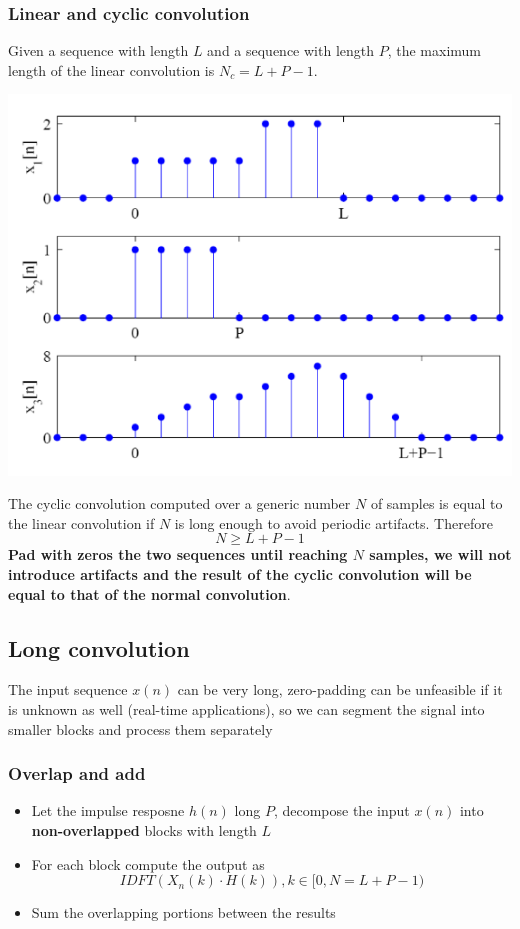 \subsubsection{Linear and cyclic convolution}
Given a sequence with length $L$ and a sequence with length $P$, the maximum length of the linear convolution is $N_c=L+P-1$.
\begin{center}
    \includegraphics[width=1\textwidth]{images/cyclic_conv_01.png}
\end{center}
The cyclic convolution computed over a generic number $N$ of samples is equal to the linear convolution if $N$ is long enough to avoid periodic artifacts. Therefore
$$
N\geq L+P-1
$$
\textbf{Pad with zeros the two sequences until reaching $N$ samples, we will not introduce artifacts and the result of the cyclic convolution will be equal to that of the normal convolution}.

\subsection{Long convolution}
The input sequence $x(n)$ can be very long, zero-padding can be unfeasible if it is unknown as well (real-time applications), so we can segment the signal into smaller blocks and process them separately

\subsubsection{Overlap and add}
\begin{itemize}
    \item Let the impulse resposne $h(n)$ long $P$, decompose the input $x(n)$ into \textbf{non-overlapped} blocks with length $L$
    \item For each block compute the output as
    $$IDFT(X_n(k)\cdot H(k)),k\in [0,N=L+P-1)$$
    \item Sum the overlapping portions between the results
\end{itemize}

